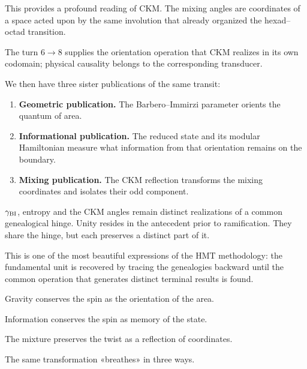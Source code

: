 This provides a profound reading of CKM. The mixing angles are coordinates
of a space acted upon by the same involution that already organized the
hexad–octad transition.\par

The turn \(6\to8\) supplies the orientation operation that CKM realizes in its own codomain; physical causality belongs to the corresponding transducer.\par

We then have three sister publications of the same transit:\par

\begin{enumerate}[leftmargin=*,itemsep=0.65em]
\item \textbf{Geometric publication.}
The Barbero–Immirzi parameter orients the quantum of area.\par

\item \textbf{Informational publication.}
The reduced state and its modular Hamiltonian measure what information from that orientation remains on the boundary.\par

\item \textbf{Mixing publication.}
The CKM reflection transforms the mixing coordinates and isolates their odd component.\par
\end{enumerate}

\(\gamma_{\rm BI}\), entropy and the CKM angles remain distinct realizations of a common genealogical hinge. Unity resides in the antecedent prior to ramification. They share the hinge, but each preserves a distinct part of it.\par

This is one of the most beautiful expressions of the HMT methodology: the fundamental unit is recovered by tracing the genealogies backward until the common operation that generates distinct terminal results is found.\par

Gravity conserves the spin as the orientation of the area.\par
Information conserves the spin as memory of the state.\par
The mixture preserves the twist as a reflection of coordinates.\par

The same transformation «breathes» in three ways.\par

